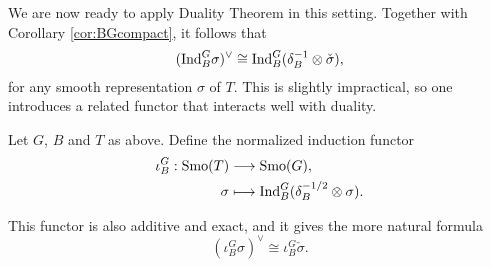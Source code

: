 We are now ready to apply Duality Theorem in this setting. Together with Corollary \ref{cor:BGcompact}, it follows that 
$$(\mathrm{Ind}_B^G\sigma)^\vee\cong\mathrm{Ind}_B^G(\delta_B^{-1}\otimes\check{\sigma}),$$
for any smooth representation $\sigma$ of $T$. This is slightly impractical, so one introduces a related functor that interacts well with duality.

\begin{defn}
    Let $G$, $B$ and $T$ as above. Define the normalized induction functor 
    \begin{align*}
        \iota_B^G:\mathrm{Smo}(T)&\longrightarrow\mathrm{Smo}(G),\\
        \sigma&\longmapsto\mathrm{Ind}_B^G(\delta_B^{-1/2}\otimes\sigma).
    \end{align*}
\end{defn}
This functor is also additive and exact, and it gives the more natural formula
$$(\iota_B^G\sigma)^\vee\cong\iota_B^G\check{\sigma}.$$
